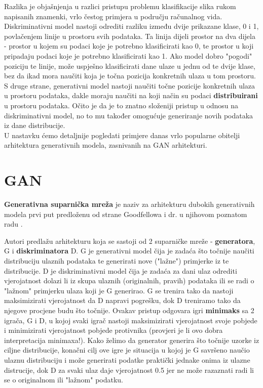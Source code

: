 \noindent Razlika je objašnjenja u razlici pristupu problemu klasifikacije slika rukom napisanih znamenki, vrlo čestog primjera u području računalnog vida. Diskriminativni model nastoji odrediti razliku između dvije prikazane klase, 0 i 1, povlačenjem linije u prostoru svih podataka. Ta linija dijeli prostor na dva dijela - prostor u kojem su podaci koje je potrebno klasificirati kao 0, te prostor u koji pripadaju podaci koje je potrebno klasificirati kao 1. Ako model dobro "pogodi" poziciju te linije, može uspješno klasificirati dane ulaze u jednu od te dvije klase, bez da ikad mora naučiti koja je točna pozicija konkretnih ulaza u tom prostoru. S druge strane, generativni model nastoji naučiti točne pozicije konkretnih ulaza u prostoru podataka, dakle moraju naučiti na koji način su podaci \textbf{distribuirani} u prostoru podataka. Očito je da je to znatno složeniji pristup u odnosu na diskriminativni model, no to mu također omogućuje generiranje novih podataka iz dane distribucije.\\

\noindent U nastavku ćemo detaljnije pogledati primjere danas vrlo popularne obitelji arhitektura generativnih modela, zasnivanih na GAN arhitekturi.



\section{GAN}
\textbf{Generativna suparnička mreža}  je naziv za arhitekturu dubokih generativnih modela prvi put predloženu od strane Goodfellowa i dr. u njihovom poznatom radu \citep{GoodfellowGAN}.

Autori predlažu arhitekturu koja se sastoji od 2 suparničke mreže - \textbf{generatora}, G i \textbf{diskriminatora} D. G je generativni model čija je zadaća što točnije naučiti distribuciju ulaznih podataka te generirati nove ("lažne") primjerke iz te distribucije. D je diskriminativni model čija je zadaća za dani ulaz odrediti vjerojatnost dolazi li iz skupa ulaznih (originalnih, pravih) podataka ili se radi o "lažnom" primjerku ulaza koji je G generirao. G se trenira tako da nastoji maksimizirati vjerojatnost da D napravi pogrešku, dok D treniramo tako da njegove procjene budu što točnije. Ovakav pristup odgovara igri \textbf{minimaks} sa 2 igrača, G i D, u kojoj svaki igrač nastoji maksimizirati vjerojatnost svoje pobjede i minimizirati vjerojatnost pobjede protivnika (provjeri je li ovo dobra interpretacija minimaxa!). Kako želimo da generator generira što točnije uzorke iz ciljne distribucije, konačni cilj ove igre je situacija u kojoj je G savršeno naučio ulaznu distribuciju i može generirati podatke praktički jednake onima iz ulazne distrucije, dok D za svaki ulaz daje vjerojatnost 0.5 jer ne može razaznati radi li se o originalnom ili "lažnom" podatku.

